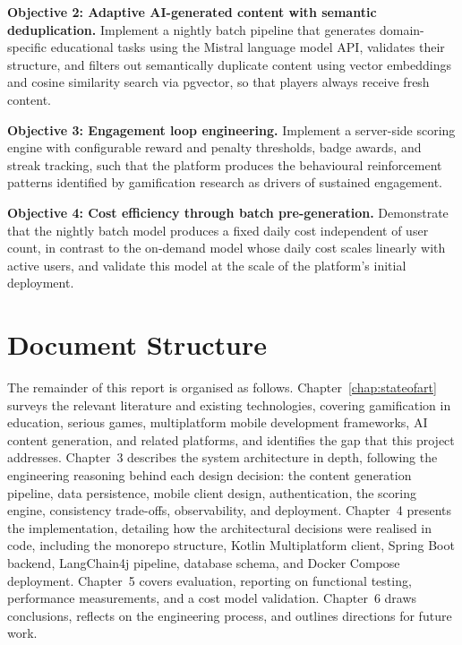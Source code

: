 \textbf{Objective 2: Adaptive AI-generated content with semantic deduplication.} Implement a nightly batch pipeline that generates domain-specific educational tasks using the Mistral language model API, validates their structure, and filters out semantically duplicate content using vector embeddings and cosine similarity search via pgvector, so that players always receive fresh content.

\textbf{Objective 3: Engagement loop engineering.} Implement a server-side scoring engine with configurable reward and penalty thresholds, badge awards, and streak tracking, such that the platform produces the behavioural reinforcement patterns identified by gamification research as drivers of sustained engagement.

\textbf{Objective 4: Cost efficiency through batch pre-generation.} Demonstrate that the nightly batch model produces a fixed daily cost independent of user count, in contrast to the on-demand model whose daily cost scales linearly with active users, and validate this model at the scale of the platform's initial deployment.

\section{Document Structure}

The remainder of this report is organised as follows. Chapter~\ref{chap:stateofart} surveys the relevant literature and existing technologies, covering gamification in education, serious games, multiplatform mobile development frameworks, AI content generation, and related platforms, and identifies the gap that this project addresses. Chapter~3 describes the system architecture in depth, following the engineering reasoning behind each design decision: the content generation pipeline, data persistence, mobile client design, authentication, the scoring engine, consistency trade-offs, observability, and deployment. Chapter~4 presents the implementation, detailing how the architectural decisions were realised in code, including the monorepo structure, Kotlin Multiplatform client, Spring Boot backend, LangChain4j pipeline, database schema, and Docker Compose deployment. Chapter~5 covers evaluation, reporting on functional testing, performance measurements, and a cost model validation. Chapter~6 draws conclusions, reflects on the engineering process, and outlines directions for future work.
